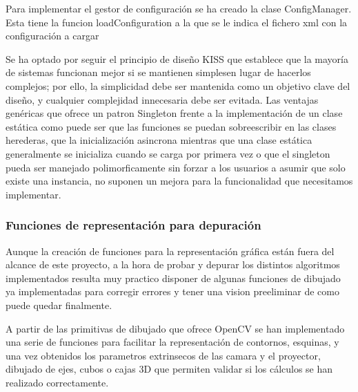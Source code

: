 Para implementar el gestor de configuración se ha creado la clase ConfigManager. Esta tiene la funcion loadConfiguration a la que se le indica el fichero xml con la configuración a cargar 

Se ha optado por seguir el principio de diseño KISS que establece que la mayoría de sistemas funcionan mejor si se mantienen simplesen lugar de hacerlos complejos; por ello, la simplicidad debe ser mantenida como un objetivo clave del diseño, y cualquier complejidad innecesaria debe ser evitada. Las ventajas genéricas que ofrece un patron Singleton frente a la implementación de un clase estática como puede ser que las funciones se puedan sobreescribir en las clases herederas, que la inicialización asincrona mientras que una clase estática generalmente se inicializa cuando se carga por primera vez o que el singleton pueda ser manejado polimorficamente sin forzar a los usuarios a asumir que solo existe una instancia, no suponen un mejora para la funcionalidad que necesitamos implementar. 

\subsubsection{Funciones de representación para depuración}
Aunque la creación de funciones para la representación gráfica están fuera del alcance de este proyecto, a la hora de probar y depurar los distintos algoritmos implementados resulta muy practico disponer de algunas funciones de dibujado ya implementadas para corregir errores y tener una vision preeliminar de como puede quedar finalmente.

A partir de las primitivas de dibujado que ofrece OpenCV se han implementado una serie de funciones para facilitar la representación de contornos, esquinas, y una vez obtenidos los parametros extrinsecos de las camara y el proyector, dibujado de ejes, cubos o cajas 3D que permiten validar si los cálculos se han realizado correctamente.


